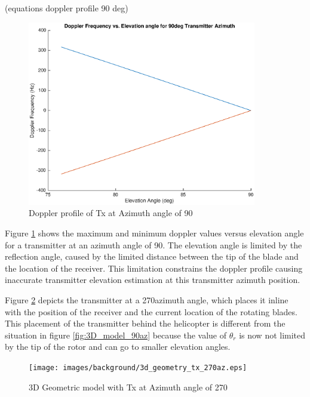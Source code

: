 (equations doppler profile 90 deg)

\begin{figure}
	\begin{center}
		\includegraphics[width=10cm]{images/background/3d_geometry_tx_90az_doppler_profile.eps}
		\caption{Doppler profile of Tx at Azimuth angle of 90\textdegree}
		\label{fig:3D_model_90az_doppler}
	\end{center}
\end{figure}

Figure \ref{fig:3D_model_90az_doppler} shows the maximum and minimum doppler values versus elevation angle for a transmitter at an azimuth angle of 90\textdegree. The elevation angle is limited by the reflection angle, caused by the limited distance between the tip of the blade and the location of the receiver. This limitation constrains the doppler profile causing inaccurate transmitter elevation estimation at this transmitter azimuth position.

Figure \ref{fig:3D_model_270az} depicts the transmitter at a 270\textdegree \space azimuth angle, which places it inline with the position of the receiver and the current location of the rotating blades. This placement of the transmitter behind the helicopter is different from the situation in figure \ref{fig:3D_model_90az} because the value of $\theta_r$ is now not limited by the tip of the rotor and can go to smaller elevation angles.

\begin{figure}
	\begin{center}
		\texttt{[image: images/background/3d\_geometry\_tx\_270az.eps]}
		\caption{3D Geometric model with Tx at Azimuth angle of 270\textdegree}
		\label{fig:3D_model_270az}
	\end{center}
\end{figure}

